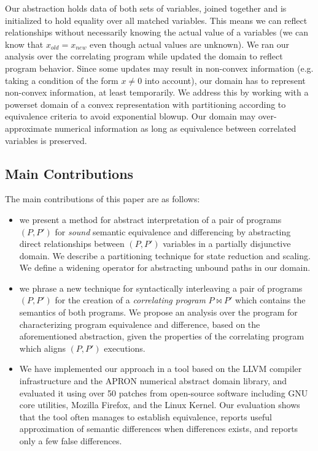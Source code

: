 Our abstraction holds data of both sets of variables, joined together and is
initialized to hold equality over all matched variables. This means we can
reflect relationships without necessarily knowing the actual value of a
variables (we can know that $x_{old} = x_{new}$ even though actual values are
unknown). We ran our analysis over the correlating program while updated the
domain to reflect program behavior. Since some updates may result in non-convex information (e.g. taking  a condition of the form $x \neq 0$ into account), our domain has to represent non-convex information, at least temporarily. We address this by working with a powerset domain of a convex representation with partitioning according to equivalence criteria to avoid exponential blowup. Our domain may over-approximate numerical information as long as equivalence between correlated variables is preserved.

\subsection{Main Contributions}
The main contributions of this paper are as follows:
\begin{itemize}
\item we present a method for abstract interpretation of a pair of programs $(P,P')$ for \emph{sound} semantic equivalence and differencing by abstracting direct relationships between $(P,P')$ variables in a partially disjunctive domain. We describe a partitioning technique for state reduction and scaling. We define a widening operator for abstracting unbound paths in our domain.
\item we phrase a new technique for syntactically interleaving a pair of programs $(P,P')$ for the creation of a \emph{correlating program} $P \bowtie P'$ which contains the semantics of both programs. We propose an analysis over the program for characterizing program equivalence and difference, based on the aforementioned abstraction, given the properties of the correlating program which aligns $(P,P')$ executions.
\item We have implemented our approach in a tool based on the LLVM compiler infrastructure and the APRON numerical abstract
    domain library, and evaluated it using over 50 patches from open-source software including GNU core utilities, Mozilla
    Firefox, and the Linux Kernel. Our evaluation shows that the tool often manages to establish equivalence, reports useful
    approximation of semantic differences when differences exists, and reports only a few false differences.
\end{itemize}


